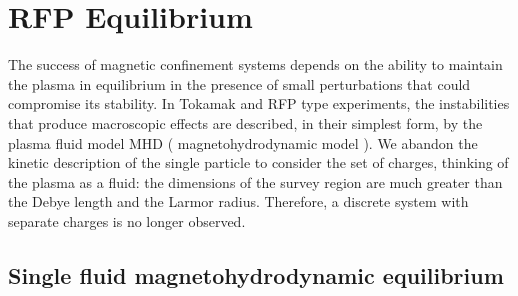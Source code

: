\chapter{RFP Equilibrium}
\label{section:2_equilibrium}

The success of magnetic confinement systems depends on the ability to maintain the plasma in equilibrium in the presence of small perturbations
that could compromise its stability. In Tokamak and RFP type experiments, the instabilities that produce macroscopic effects are described, in their simplest form, by the plasma fluid model MHD ( magnetohydrodynamic model ). 
We abandon the kinetic description of the single particle to consider the set of charges, thinking of the plasma as a fluid: the dimensions of the survey region are much greater than the Debye length and the Larmor radius. Therefore, a discrete system with separate charges is no longer observed.




\section{Single fluid magnetohydrodynamic equilibrium}

